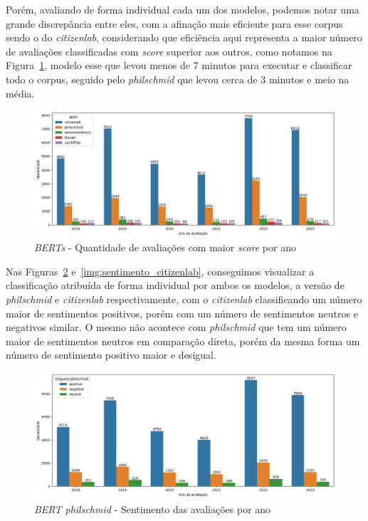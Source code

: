 Porém, avaliando de forma individual cada um dos modelos, podemos notar uma grande discrepância entre eles, com a afinação mais eficiente para esse corpus sendo o do \textit{citizenlab}, considerando que eficiência aqui representa a maior número de avaliações classificadas com \textit{score} superior aos outros, como notamos na Figura~\ref{img:rinha_de_berts}, modelo esse que levou menos de 7 minutos para executar e classificar todo o corpus, seguido pelo \textit{philschmid} que levou cerca de 3 minutos e meio na média.

\begin{figure}
	\centering
	\includegraphics[width=1\textwidth]{figs/bert/desempenho_berts.png}
	\caption{\textit{BERTs} - Quantidade de avaliações com maior \textit{score} por ano}
	\label{img:rinha_de_berts}
\end{figure}

Nas Figuras~\ref{img:sentimento_phil} e~\ref{img:sentimento_citizenlab}, conseguimos visualizar a classificação atribuída de forma individual por ambos os modelos, a versão de \textit{philschmid} e \textit{citizenlab} respectivamente, com o \textit{citizenlab} classificando um número maior de sentimentos positivos, porém com um número de sentimentos neutros e negativos similar. O mesmo não acontece com \textit{philschmid} que tem um número maior de sentimentos neutros em comparação direta, porém da mesma forma um número de sentimento positivo maior e desigual.

\begin{figure}
	\centering
	\centering
	\includegraphics[width=1\textwidth]{figs/bert/classificacao_phil.png}
	\caption{\textit{BERT philschmid} - Sentimento das avaliações por ano}
	\label{img:sentimento_phil}
\end{figure}

